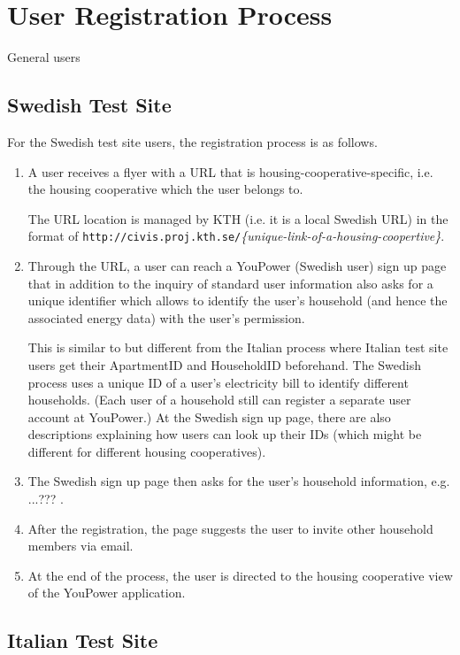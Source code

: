 \section{User Registration Process}

General users

\subsection{Swedish Test Site}

For the Swedish test site users, the registration process is as follows. 

\begin{enumerate}
\item A user receives a flyer with a URL that is housing-cooperative-specific, i.e. the housing cooperative which the user belongs to. 

The URL location is managed by KTH (i.e. it is a local Swedish URL) in the format of  \texttt{\small http://civis.proj.kth.se/}\textit{\{unique-link-of-a-housing-coopertive\}}. 

\item Through the URL, a user can reach a YouPower (Swedish user) sign up page that in addition to the inquiry of standard user information also asks for a unique identifier which allows to identify the user's household (and hence the associated energy data) with the user's permission. 

This is similar to but different from the Italian process where Italian test site users get their ApartmentID and HouseholdID beforehand. The Swedish process uses a unique ID of a user's electricity bill to identify different households. (Each user of a household still can register a separate user account at YouPower.) At the Swedish sign up page, there are also descriptions explaining how users can look up their IDs (which might be different for different housing cooperatives). 

\item The Swedish sign up page then asks for the user's household information, e.g. ...??? . 

\item After the registration, the page suggests the user to invite other household members via email.

\item At the end of the process, the user is directed to the housing cooperative view of the YouPower application. 

\end{enumerate}

\subsection{Italian Test Site}